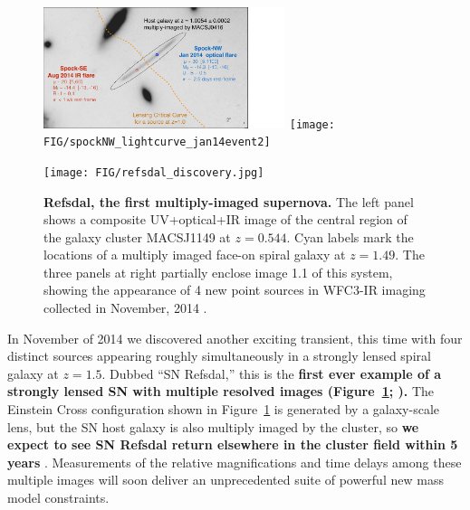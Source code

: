 \documentclass[12pt]{article}
\begin{document}
\begin{figure}
\vspace{-15mm}
\begin{center}
\includegraphics[width=0.63\textwidth]{FIG/spock_summary}
\texttt{[image: FIG/spockNW\_lightcurve\_jan14event2]}
\caption{ \label{fig:spock} %
{\bf Spock, a peculiar pair of events.}  {\it(Left)} A template
\HST\ image in the F814W band showing the locations of two transient
sources (nicknamed ``Spock-SE'' and ``Spock-NW'') that separately
appeared in adjacent images of a strongly-lensed galaxy at $z=1.0$
behind the Frontier Field cluster MACSJ0416. Lens models indicate that
a critical curve passes roughly mid-way between them, and they are
magnified by $\mu\sim20-30$ (3-4 mags).  {\it(Right)} The light curve
of the Spock-NW event was captured in high-cadence HST-ACS imaging,
and the entire episode lasted only $\sim3$ rest-frame days. 
}
\vspace{3mm}
\texttt{[image: FIG/refsdal\_discovery.jpg]}
 \caption{ %
  {\bf Refsdal, the first multiply-imaged supernova.}
   The left panel shows a composite UV+optical+IR image of the central
   region of the galaxy cluster MACSJ1149 at $z=0.544$.  Cyan labels
   mark the locations of a multiply imaged face-on spiral galaxy at
   $z=1.49$.  The three panels at
   right partially enclose image 1.1 of this system, showing the
   appearance of 4 new point sources in WFC3-IR imaging collected in
   November, 2014 \citep{Kelly:2015}.
\label{fig:refsdal}  }
\end{center}
\end{figure}

In November of 2014 we discovered another exciting transient, this
time with four distinct sources appearing roughly simultaneously in a
strongly lensed spiral galaxy at $z=1.5$.  Dubbed ``SN Refsdal,'' this
is the {\bf first ever example of a strongly lensed SN with multiple
  resolved images (Figure~\ref{fig:refsdal}; \citealt{Kelly:2015}).}
The Einstein Cross configuration shown in Figure~\ref{fig:refsdal} is
generated by a galaxy-scale lens, but the SN host galaxy is also
multiply imaged by the cluster, so {\bf we expect to see SN Refsdal
  return elsewhere in the cluster field within 5 years}
\citep{Oguri:2015,Sharon:2015}.  Measurements of the relative
magnifications and time delays among these multiple images will soon
deliver an unprecedented suite of powerful new mass model constraints.
\end{document}
